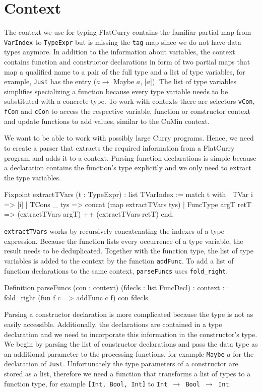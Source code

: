 \documentclass[paper = a4, fleqn, twoside]{scrreprt}
\newcommand{\coqinline}[1]{\texttt{#1}}
\begin{document}
\section{Context}
\label{context}
The context we use for typing FlatCurry contains the familiar partial map from \coqinline{VarIndex} to \coqinline{TypeExpr} but is missing the \coqinline{tag} map since we do not have data types anymore. In addition to the information about variables, the context contains function and constructor declarations in form of two partial maps that map a qualified name to a pair of the full type and a list of type variables, for example, \texttt{Just} has the entry ($a \rightarrow$ Maybe $a$, [$a$]). The list of type variables simplifies specializing a function because every type variable needs to be substituted with a concrete type. To work with contexts there are selectors \coqinline{vCon}, \coqinline{fCon} and \coqinline{cCon} to access the respective variable, function or constructor context and update functions to add values, similar to the CuMin context.\\
\par \noindent
We want to be able to work with possibly large Curry programs. Hence, we need to create a parser that extracts the required information from a FlatCurry program and adds it to a context. Parsing function declarations is simple because a declaration contains the function's type explicitly and we only need to extract the type variables.
\begin{coqcode}
Fixpoint extractTVars (t : TypeExpr) : list TVarIndex :=
  match t with
  | TVar i      => [i]
  | TCons _ tys => concat (map extractTVars tys)
  | FuncType argT retT => (extractTVars argT) ++ (extractTVars retT)
  end.
\end{coqcode}
\coqinline{extractTVars} works by recursively concatenating the indexes of a type expression. Because the function lists every occurrence of a type variable, the result needs to be deduplicated. Together with the function type, the list of type variables is added to the context by the function \texttt{addFunc}. To add a list of function declarations to the same context, \texttt{parseFuncs} uses \coqinline{fold_right}.
\begin{coqcode}
Definition parseFuncs (con : context) (fdecls : list FuncDecl) : context :=
  fold_right (fun f c => addFunc c f) con fdecls.
\end{coqcode}
\par \noindent
Parsing a constructor declaration is more complicated because the type is not as easily accessible. Additionally, the declarations are contained in a type declaration and we need to incorporate this information in the constructor's type. We begin by parsing the list of constructor declarations and pass the data type as an additional parameter to the processing functions, for example \texttt{Maybe} $a$ for the declaration of \texttt{Just}. Unfortunately the type parameters of a constructor are stored as a list, therefore we need a function that transforms a list of types to a function type, for example \texttt{[Int, Bool, Int]} to \mbox{\texttt{Int $\rightarrow$ Bool $\rightarrow$ Int}}.
\end{document}
